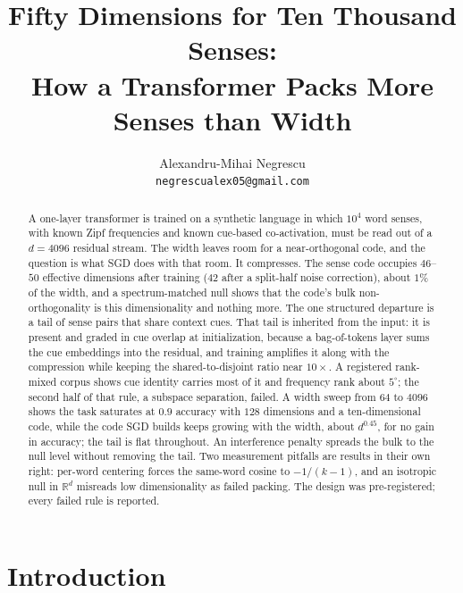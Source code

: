 \documentclass{article}
\title{Fifty Dimensions for Ten Thousand Senses:\\
How a Transformer Packs More Senses than Width}
\author{Alexandru-Mihai Negrescu \\ \texttt{negrescualex05@gmail.com}}
\newcommand{\degr}{^{\circ}}
\begin{document}
\maketitle
{}

\begin{abstract}
  A one-layer transformer is trained on a synthetic language in which $10^4$ word
  senses, with known Zipf frequencies and known cue-based co-activation, must be
  read out of a $d{=}4096$ residual stream. The width leaves room for a
  near-orthogonal code, and the question is what SGD does with that room. It
  compresses. The sense code occupies $46$--$50$ effective dimensions after
  training ($42$ after a split-half noise correction), about $1\%$ of the width,
  and a spectrum-matched null shows that the code's bulk non-orthogonality is this
  dimensionality and nothing more. The one
  structured departure is a tail of sense pairs that share context cues. That tail
  is inherited from the input: it is present and graded in cue overlap at
  initialization, because a bag-of-tokens layer sums the cue embeddings into the
  residual, and training amplifies it along with the compression while keeping the
  shared-to-disjoint ratio near $10\times$. A registered rank-mixed corpus shows
  cue identity carries most of it and frequency rank about $5\degr$; the second
  half of that rule, a subspace separation, failed. A width sweep from $64$ to
  $4096$ shows the task saturates at $0.9$ accuracy with $128$ dimensions and a
  ten-dimensional code, while the code SGD builds keeps growing with the width,
  about $d^{0.45}$, for no gain in accuracy; the tail is flat throughout. An
  interference penalty spreads the bulk to the null level without removing
  the tail. Two measurement pitfalls are results in their own right: per-word
  centering forces the same-word cosine to $-1/(k{-}1)$, and an isotropic null in
  $\mathbb{R}^d$ misreads low dimensionality as failed packing. The design was
  pre-registered; every failed rule is reported.
\end{abstract}

\section{Introduction}
\end{document}
